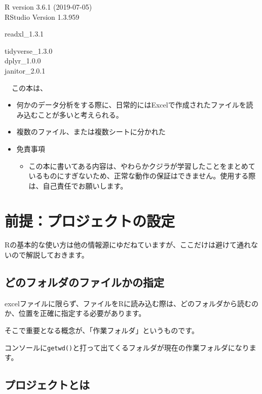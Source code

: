 \documentclass[
  xelatex,ja=standard, b5paper]{bxjsbook}
\providecommand{\tightlist}{%
  \setlength{\itemsep}{0pt}\setlength{\parskip}{0pt}}
\begin{document}
R version 3.6.1 (2019-07-05)\\
RStudio Version 1.3.959

readxl\_1.3.1

tidyverse\_1.3.0\\
dplyr\_1.0.0\\
janitor\_2.0.1

　この本は、

\begin{itemize}
\item
  何かのデータ分析をする際に、日常的にはExcelで作成されたファイルを読み込むことが多いと考えられる。
\item
  複数のファイル、または複数シートに分かれた
\item
  免責事項

  \begin{itemize}
  \tightlist
  \item
    この本に書いてある内容は、やわらかクジラが学習したことをまとめているものにすぎないため、正常な動作の保証はできません。使用する際は、自己責任でお願いします。
  \end{itemize}
\end{itemize}

\hypertarget{project}{%
\chapter{前提：プロジェクトの設定}\label{project}}

Rの基本的な使い方は他の情報源にゆだねていますが、ここだけは避けて通れないので解説しておきます。

\hypertarget{ux3069ux306eux30d5ux30a9ux30ebux30c0ux306eux30d5ux30a1ux30a4ux30ebux304bux306eux6307ux5b9a}{%
\section{どのフォルダのファイルかの指定}\label{ux3069ux306eux30d5ux30a9ux30ebux30c0ux306eux30d5ux30a1ux30a4ux30ebux304bux306eux6307ux5b9a}}

excelファイルに限らず、ファイルをRに読み込む際は、どのフォルダから読むのか、位置を正確に指定する必要があります。

そこで重要となる概念が、「作業フォルダ」というものです。

コンソールに\texttt{getwd()}と打って出てくるフォルダが現在の作業フォルダになります。

\hypertarget{ux30d7ux30edux30b8ux30a7ux30afux30c8ux3068ux306f}{%
\section{プロジェクトとは}\label{ux30d7ux30edux30b8ux30a7ux30afux30c8ux3068ux306f}}
\end{document}
